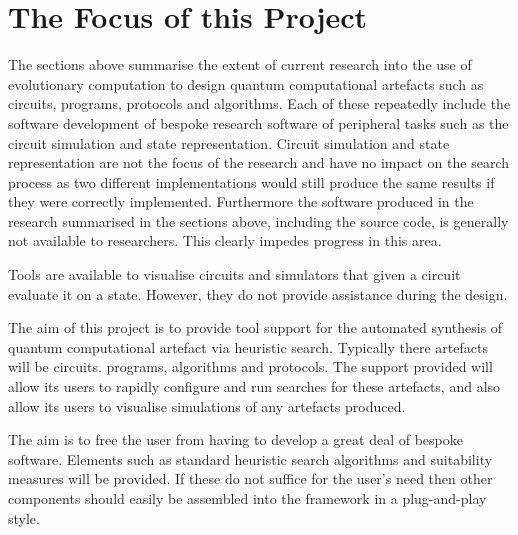 \section{The Focus of this Project}
\label{sec:focusofproject}
The sections above summarise the extent of current research into the use of evolutionary computation to design quantum computational artefacts such as circuits, programs, protocols and algorithms.
Each of these repeatedly include the software development of bespoke research software of peripheral tasks such as the circuit simulation and state representation.
Circuit simulation and state representation are not the focus of the research and have no impact on the search process as two different implementations would still produce the same results if they were correctly implemented.
Furthermore the software produced in the research summarised in the sections above, including the source code, is generally not available to researchers.
This clearly impedes progress in this area.


Tools are available to visualise circuits and simulators that given a circuit evaluate it on a state.
However, they do not provide assistance during the design.

The aim of this project is to provide tool support for the automated synthesis of quantum computational artefact via heuristic search.
Typically there artefacts will be circuits. programs, algorithms and protocols.
The support provided will allow its users to rapidly configure and run searches for these artefacts, and also allow its users to visualise simulations of any artefacts produced.

The aim is to free the user from having to develop a great deal of bespoke software.
Elements such as standard heuristic search algorithms and suitability measures will be provided.
If these do not suffice for the user's need then other components should easily be assembled into the framework in a plug-and-play style.

